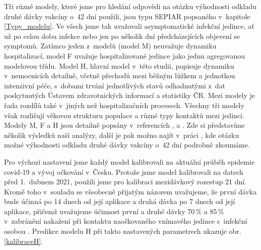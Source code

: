 Tři různé modely, které jsme pro hledání odpovědi na otázku výhodnosti odkladu druhé dávky vakcíny o~42 dní použili, jsou typu SEPIAR popsaného v~kapitole \ref{Typy_modelu}. Ve všech jsme tak uvažovali asymptomatické infekční jedince, ať už po celou dobu infekce nebo jen po několik dní předcházejících objevení se symptomů. Zatímco jeden z~modelů (model M) neuvažuje dynamiku hospitalizací, model F uvažuje hospitalizované jedince jako jednu agregovanou modelovou třídu. Model H, hlavní model v~této studii, popisuje dynamiku v~nemocnicích detailně, včetně přechodů mezi běžným lůžkem a jednotkou intenzivní péče, s~dobami trvání jednotlivých stavů odhadnutými z~dat poskytnutých Ústavem zdravotnických informací a statistiky ČR. Mezi modely je řada rozdílů také v~jiných než hospitalizačních procesech. Všechny tři modely však rozlišují věkovou strukturu populace a různé typy kontaktů mezi jedinci. Modely M, F a H jsou detailně popsány v~referencích \cite{M-techrep2021}, \cite{Smid2021seir} a \cite{vaccpaper}. Zde si představíme několik výsledků naší analýzy, další je pak možno najít v~práci \cite{vaccpaper}, kde otázku možné výhodnosti odkladu druhé dávky vakcíny o~42 dní podrobně zkoumáme. 

Pro výchozí nastavení jsme každý model kalibrovali na aktuální průběh epidemie covid-19 a vývoj očkování v~Česku. Protože jsme model kalibrovali na datech před 1.\ dubnem 2021, použili jsme pro kalibraci mezidávkový rozestup 21 dní. Kromě toho v~souladu se všeobecně přijatým názorem uvažujeme, že první dávka bude účinná po 14 dnech od její aplikace a druhá dávka po 7 dnech od její aplikace, přičemž uvažujeme účinnost první a druhé dávky 70\,\% a 85\,\% v~zabránění nakažení při kontaktu naočkovaného vnímavého jedince s~infekční osobou \cite{Hall_etal2021}. Predikce modelu H při takto nastavených parametrech ukazuje obr.\,\ref{kalibraceH}. 

